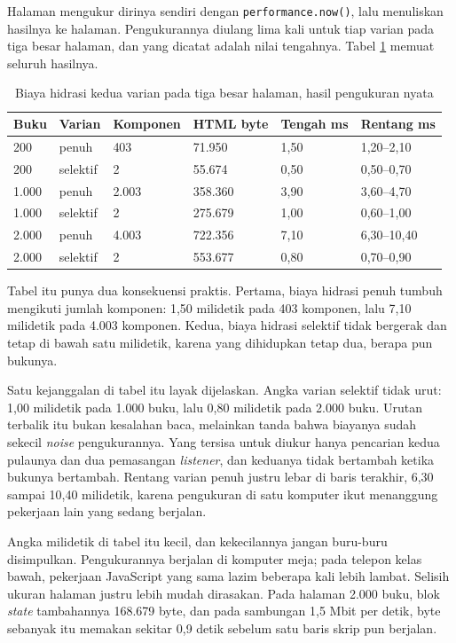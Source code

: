 Halaman mengukur dirinya sendiri dengan \texttt{performance.now()}, lalu
menuliskan hasilnya ke halaman. Pengukurannya diulang lima kali untuk tiap
varian pada tiga besar halaman, dan yang dicatat adalah nilai tengahnya.
Tabel \ref{tab:hidrasi} memuat seluruh hasilnya.

\begin{table}[!htb]
  \centering
  \caption{Biaya hidrasi kedua varian pada tiga besar halaman, hasil
           pengukuran nyata}
  \label{tab:hidrasi}
  \begin{tabularx}{\textwidth}{Xlllll}
    \hline
    \textbf{Buku} & \textbf{Varian} & \textbf{Komponen} & \textbf{HTML byte} & \textbf{Tengah ms} & \textbf{Rentang ms} \\
    \hline
    200 & penuh & 403 & 71.950 & 1,50 & 1,20--2,10 \\
    \hline
    200 & selektif & 2 & 55.674 & 0,50 & 0,50--0,70 \\
    \hline
    1.000 & penuh & 2.003 & 358.360 & 3,90 & 3,60--4,70 \\
    \hline
    1.000 & selektif & 2 & 275.679 & 1,00 & 0,60--1,00 \\
    \hline
    2.000 & penuh & 4.003 & 722.356 & 7,10 & 6,30--10,40 \\
    \hline
    2.000 & selektif & 2 & 553.677 & 0,80 & 0,70--0,90 \\
    \hline
  \end{tabularx}
\end{table}

Tabel itu punya dua konsekuensi praktis. Pertama, biaya hidrasi penuh tumbuh
mengikuti jumlah komponen: 1,50 milidetik pada 403 komponen, lalu 7,10
milidetik pada 4.003 komponen. Kedua, biaya hidrasi selektif tidak bergerak
dan tetap di bawah satu milidetik, karena yang dihidupkan tetap dua, berapa
pun bukunya.

Satu kejanggalan di tabel itu layak dijelaskan. Angka varian selektif tidak
urut: 1,00 milidetik pada 1.000 buku, lalu 0,80 milidetik pada 2.000 buku.
Urutan terbalik itu bukan kesalahan baca, melainkan tanda bahwa biayanya
sudah sekecil \textit{noise} pengukurannya. Yang tersisa untuk diukur hanya
pencarian kedua pulaunya dan dua pemasangan \textit{listener}, dan keduanya
tidak bertambah ketika bukunya bertambah. Rentang varian penuh justru lebar
di baris terakhir, 6,30 sampai 10,40 milidetik, karena pengukuran di satu
komputer ikut menanggung pekerjaan lain yang sedang berjalan.

Angka milidetik di tabel itu kecil, dan kekecilannya jangan buru-buru
disimpulkan. Pengukurannya berjalan di komputer meja; pada telepon kelas
bawah, pekerjaan JavaScript yang sama lazim beberapa kali lebih lambat.
Selisih ukuran halaman justru lebih mudah dirasakan. Pada halaman 2.000 buku,
blok \textit{state} tambahannya 168.679 byte, dan pada sambungan 1,5 Mbit per
detik, byte sebanyak itu memakan sekitar 0,9 detik sebelum satu baris skrip
pun berjalan.

